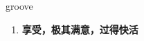 
\begin{frame}
{\huge groove}
\begin{center}
\begin{enumerate}\Large
  \item \textbf{享受，极其满意，过得快活}
\end{enumerate}
\end{center}
\end{frame}
